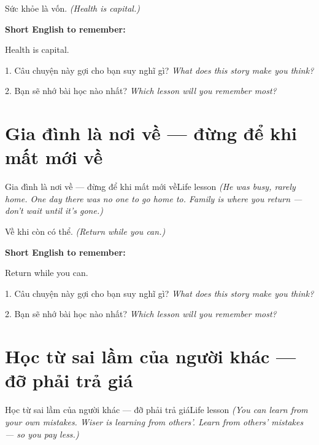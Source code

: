 \begin{baihoc}
Sức khỏe là vốn.
\textit{(Health is capital.)}
\end{baihoc}

\begin{ghinhoanh}
\textbf{Short English to remember:}

Health is capital.

\end{ghinhoanh}

\begin{tuhocnhanh}
1. Câu chuyện này gợi cho bạn suy nghĩ gì? \textit{What does this story make you think?}

2. Bạn sẽ nhớ bài học nào nhất? \textit{Which lesson will you remember most?}
\end{tuhocnhanh}
\ngancach


\section{Gia đình là nơi về — đừng để khi mất mới về}
\begin{truyen}{Gia đình là nơi về — đừng để khi mất mới về}{Life lesson}
\textit{(He was busy, rarely home. One day there was no one to go home to. Family is where you return — don't wait until it's gone.)}
\end{truyen}

\begin{baihoc}
Về khi còn có thể.
\textit{(Return while you can.)}
\end{baihoc}

\begin{ghinhoanh}
\textbf{Short English to remember:}

Return while you can.

\end{ghinhoanh}

\begin{tuhocnhanh}
1. Câu chuyện này gợi cho bạn suy nghĩ gì? \textit{What does this story make you think?}

2. Bạn sẽ nhớ bài học nào nhất? \textit{Which lesson will you remember most?}
\end{tuhocnhanh}
\ngancach


\section{Học từ sai lầm của người khác — đỡ phải trả giá}
\begin{truyen}{Học từ sai lầm của người khác — đỡ phải trả giá}{Life lesson}
\textit{(You can learn from your own mistakes. Wiser is learning from others'. Learn from others' mistakes — so you pay less.)}
\end{truyen}

